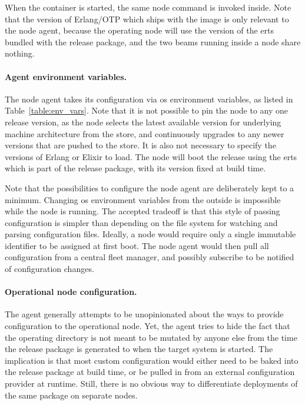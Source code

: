 When the container is started, the same node command is invoked inside. Note that the version of Erlang/OTP which ships with the image is only relevant to the node agent, because the operating node will use the version of the \acrshort{erts} bundled with the release package, and the two \acrshort{beam}s running inside a node share nothing.

\paragraph{Agent environment variables.}

The node agent takes its configuration via \acrshort{os} environment variables, as listed in Table~\ref{table:env_vars}. Note that it is not possible to pin the node to any one release version, as the node selects the latest available version for underlying machine architecture from the store, and continuously upgrades to any newer versions that are pushed to the store. It is also not necessary to specify the versions of Erlang or Elixir to load. The node will boot the release using the \acrshort{erts} which is part of the release package, with its version fixed at build time.

Note that the possibilities to configure the node agent are deliberately kept to a minimum. Changing \acrshort{os} environment variables from the outside is impossible while the node is running. The accepted tradeoff is that this style of passing configuration is simpler than depending on the file system for watching and parsing configuration files. Ideally, a node would require only a single immutable identifier to be assigned at first boot. The node agent would then pull all configuration from a central fleet manager, and possibly subscribe to be notified of configuration changes.




\cleardoublepage
\paragraph{Operational node configuration.}
The agent generally attempts to be unopinionated about the ways to provide configuration to the operational node. Yet, the agent tries to hide the fact that the operating directory is not meant to be mutated by anyone else from the time the release package is generated to when the target system is started. The implication is that most custom configuration would either need to be baked into the release package at build time, or be pulled in from an external configuration provider at runtime. Still, there is no obvious way to differentiate deployments of the same package on separate nodes.

